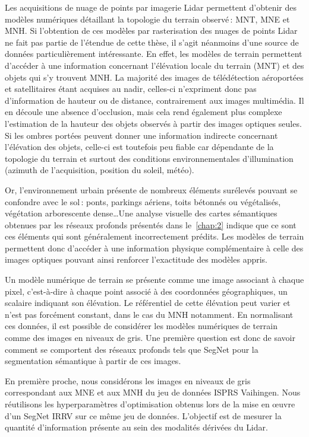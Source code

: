 Les acquisitions de nuage de points par imagerie \gls{Lidar} permettent d'obtenir des modèles numériques détaillant la topologie du terrain observé\,: \gls{MNT}, \gls{MNE} et \gls{MNH}. Si l'obtention de ces modèles par rasterisation des nuages de points \gls{Lidar} ne fait pas partie de l'étendue de cette thèse, il s'agit néanmoins d'une source de données particulièrement intéressante. En effet, les modèles de terrain permettent d'accéder à une information concernant l'élévation locale du terrain (\gls{MNT}) et des objets qui s'y trouvent \gls{MNH}. La majorité des images de télédétection aéroportées et satellitaires étant acquises au nadir, celles-ci n'expriment donc pas d'information de hauteur ou de distance, contrairement aux images multimédia. Il en découle une absence d'occlusion, mais cela rend également plus complexe l'estimation de la hauteur des objets observés à partir des images optiques seules. Si les ombres portées peuvent donner une information indirecte concernant l'élévation des objets, celle-ci est toutefois peu fiable car dépendante de la topologie du terrain et surtout des conditions environnementales d'illumination (azimuth de l'acquisition, position du soleil, météo).

Or, l'environnement urbain présente de nombreux éléments surélevés pouvant se confondre avec le sol\,: ponts, parkings aériens, toits bétonnés ou végétalisés, végétation arborescente dense\dots Une analyse visuelle des cartes sémantiques obtenues par les réseaux profonds présentés dans le~\cref{chap:2} indique que ce sont ces éléments qui sont généralement incorrectement prédits. Les modèles de terrain permettent donc d'accéder à une information physique complémentaire à celle des images optiques pouvant ainsi renforcer l'exactitude des modèles appris.

Un modèle numérique de terrain se présente comme une image associant à chaque pixel, c'est-à-dire à chaque point associé à des coordonnées géographiques, un scalaire indiquant son élévation. Le référentiel de cette élévation peut varier et n'est pas forcément constant, dans le cas du \gls{MNH} notamment. En normalisant ces données, il est possible de considérer les modèles numériques de terrain comme des images en niveaux de gris. Une première question est donc de savoir comment se comportent des réseaux profonds tels que SegNet pour la segmentation sémantique à partir de ces images.

En première proche, nous considérons les images en niveaux de gris correspondant aux \gls{MNE} et aux \gls{MNH} du jeu de données \gls{ISPRS} Vaihingen. Nous réutilisons les hyperparamètres d'optimisation obtenus lors de la mise en \oe{}uvre d'un SegNet \gls{IRRV} sur ce même jeu de données. L'objectif est de mesurer la quantité d'information présente au sein des modalités dérivées du \gls{Lidar}.

